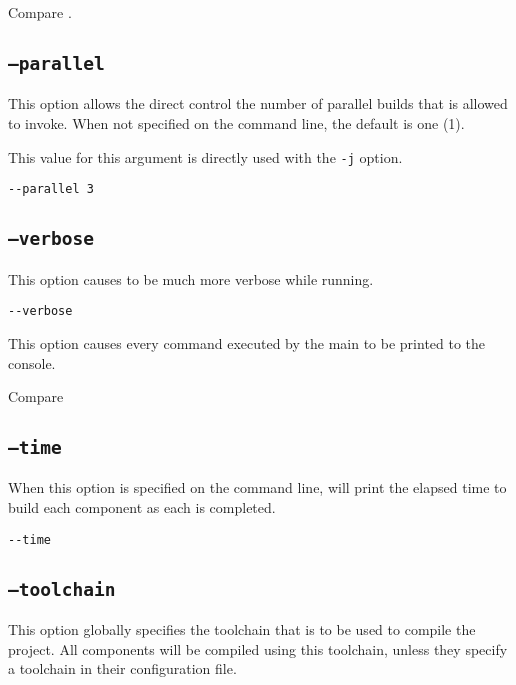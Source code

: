 Compare .

\subsection{\texttt{--parallel}}\label{usinglmsbw:parallel}

This option allows the direct control the number of parallel builds
that \make is allowed to invoke.  When not specified on the command
line, the default is one (1).

This value for this argument is directly used with the \gnumake
\texttt{-j} option.

\begin{verbatim}
--parallel 3
\end{verbatim}

\subsection{\texttt{--verbose}}\label{usinglmsbw:verbose}

This option causes \lmsbw to be much more verbose while running.

\begin{verbatim}
--verbose
\end{verbatim}

This option causes every command executed by the main \makefile to be
printed to the console.

Compare 

\subsection{\texttt{--time}}\label{usinglmsbw:time}

When this option is specified on the command line, \lmsbw will print
the elapsed time to build each component as each is completed.

\begin{verbatim}
--time
\end{verbatim}

\subsection{\texttt{--toolchain}}\label{usinglmsbw:toolchain}

This option globally specifies the toolchain that is to be used to
compile the project.  All components will be compiled using this
toolchain, unless they specify a toolchain in their configuration
file.

